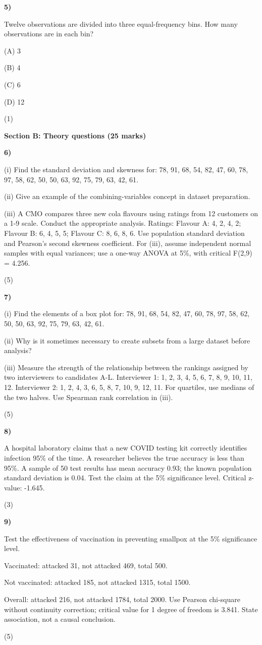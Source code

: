 \documentclass[11pt,a4paper]{article}
\newcommand{\question}[3]{\par\vspace{8pt}\noindent\begin{minipage}[t]{0.075\linewidth}\textbf{#1)}\end{minipage}\begin{minipage}[t]{0.855\linewidth}#3\end{minipage}\hfill\begin{minipage}[t]{0.055\linewidth}\raggedleft(#2)\end{minipage}\par}
\begin{document}
\question{5}{1}{Twelve observations are divided into three equal-frequency bins. How many observations are in each bin?\par (A) 3\par (B) 4\par (C) 6\par (D) 12}
\newpage\textbf{Section B: Theory questions (25 marks)}\par
\question{6}{5}{(i) Find the standard deviation and skewness for: 78, 91, 68, 54, 82, 47, 60, 78, 97, 58, 62, 50, 50, 63, 92, 75, 79, 63, 42, 61.\par (ii) Give an example of the combining-variables concept in dataset preparation.\par (iii) A CMO compares three new cola flavours using ratings from 12 customers on a 1-9 scale. Conduct the appropriate analysis. Ratings: Flavour A: 4, 2, 4, 2; Flavour B: 6, 4, 5, 5; Flavour C: 8, 6, 8, 6. Use population standard deviation and Pearson's second skewness coefficient. For (iii), assume independent normal samples with equal variances; use a one-way ANOVA at 5\%, with critical F(2,9) = 4.256.}
\question{7}{5}{(i) Find the elements of a box plot for: 78, 91, 68, 54, 82, 47, 60, 78, 97, 58, 62, 50, 50, 63, 92, 75, 79, 63, 42, 61.\par (ii) Why is it sometimes necessary to create subsets from a large dataset before analysis?\par (iii) Measure the strength of the relationship between the rankings assigned by two interviewers to candidates A-L. Interviewer 1: 1, 2, 3, 4, 5, 6, 7, 8, 9, 10, 11, 12. Interviewer 2: 1, 2, 4, 3, 6, 5, 8, 7, 10, 9, 12, 11. For quartiles, use medians of the two halves. Use Spearman rank correlation in (iii).}
\question{8}{3}{A hospital laboratory claims that a new COVID testing kit correctly identifies infection 95\% of the time. A researcher believes the true accuracy is less than 95\%. A sample of 50 test results has mean accuracy 0.93; the known population standard deviation is 0.04. Test the claim at the 5\% significance level. Critical z-value: -1.645.}
\question{9}{5}{Test the effectiveness of vaccination in preventing smallpox at the 5\% significance level.\par Vaccinated: attacked 31, not attacked 469, total 500.\par Not vaccinated: attacked 185, not attacked 1315, total 1500.\par Overall: attacked 216, not attacked 1784, total 2000. Use Pearson chi-square without continuity correction; critical value for 1 degree of freedom is 3.841. State association, not a causal conclusion.}
\end{document}
